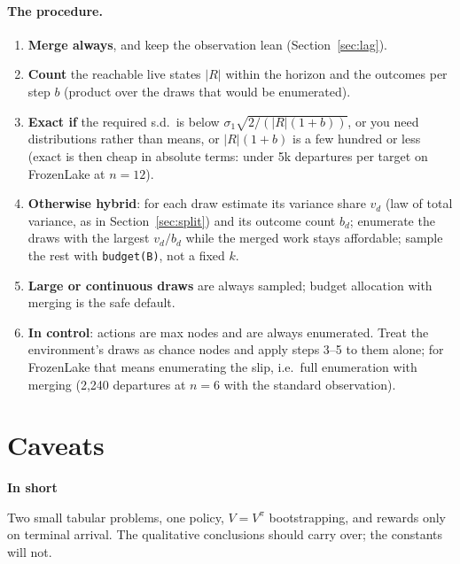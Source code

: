 \documentclass[11pt]{article}
\newcommand{\code}[1]{\texttt{#1}}
\newcommand{\shadedbox}[3]{\par\smallskip\noindent\colorbox{#1}{\parbox{\dimexpr\linewidth-2\fboxsep}{\textbf{#2}\par #3}}\par\smallskip}
\newcommand{\takeaway}[1]{\shadedbox{okbg}{In short}{#1}}
\begin{document}
\paragraph{The procedure.}
\begin{enumerate}
\item \textbf{Merge always}, and keep the observation lean (Section~\ref{sec:lag}).
\item \textbf{Count} the reachable live states $|R|$ within the horizon and the outcomes per step $b$ (product over the
  draws that would be enumerated).
\item \textbf{Exact if} the required s.d.\ is below $\sigma_1\sqrt{2/(|R|(1+b))}$, or you need distributions rather
  than means, or $|R|(1+b)$ is a few hundred or less (exact is then cheap in absolute terms: under 5k departures per
  target on FrozenLake at $n=12$).
\item \textbf{Otherwise hybrid}: for each draw estimate its variance share $v_d$ (law of total variance, as in
  Section~\ref{sec:split}) and its outcome count $b_d$; enumerate the draws with the largest $v_d/b_d$ while the merged
  work stays affordable; sample the rest with \code{budget(B)}, not a fixed $k$.
\item \textbf{Large or continuous draws} are always sampled; budget allocation with merging is the safe default.
\item \textbf{In control}: actions are max nodes and are always enumerated. Treat the environment's draws as chance
  nodes and apply steps 3--5 to them alone; for FrozenLake that means enumerating the slip, i.e.\ full enumeration with
  merging (2{,}240 departures at $n=6$ with the standard observation).
\end{enumerate}

\section{Caveats}\label{sec:caveats}

\takeaway{Two small tabular problems, one policy, $V=V^\pi$ bootstrapping, and rewards only on terminal arrival. The
qualitative conclusions should carry over; the constants will not.}
\end{document}
